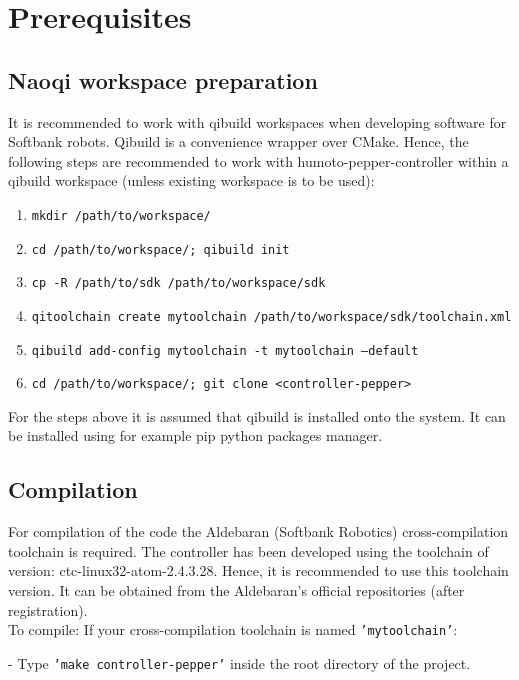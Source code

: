 \section{Prerequisites}

\subsection{Naoqi workspace preparation}
\noindent It is recommended to work with qibuild workspaces when developing software for Softbank robots. Qibuild is a
convenience wrapper over CMake. Hence, the following steps are recommended
to work with humoto-pepper-controller within a qibuild workspace (unless existing workspace is to be used):

\begin{enumerate}
\item \texttt{mkdir /path/to/workspace/}
\item \texttt{cd /path/to/workspace/; qibuild init}
\item \texttt{cp -R /path/to/sdk /path/to/workspace/sdk}
\item \texttt{qitoolchain create mytoolchain /path/to/workspace/sdk/toolchain.xml}
\item \texttt{qibuild add-config mytoolchain -t mytoolchain --default}
\item \texttt{cd /path/to/workspace/; git clone <controller-pepper>}
\end{enumerate}

\noindent For the steps above it is assumed that qibuild is installed onto the system. It can be installed using for example pip
python packages manager.

\subsection{Compilation}
\noindent For compilation of the code the Aldebaran (Softbank Robotics) cross-compilation toolchain is required. The
controller has been developed using the toolchain of version: ctc-linux32-atom-2.4.3.28. Hence, it is recommended to use
this toolchain version. It can be obtained from the Aldebaran's official repositories (after registration).\\

\noindent To compile:
\noindent If your cross-compilation toolchain is named \texttt{'mytoolchain'}:

- Type \texttt{'make controller-pepper'} inside the root directory of the project.\\

